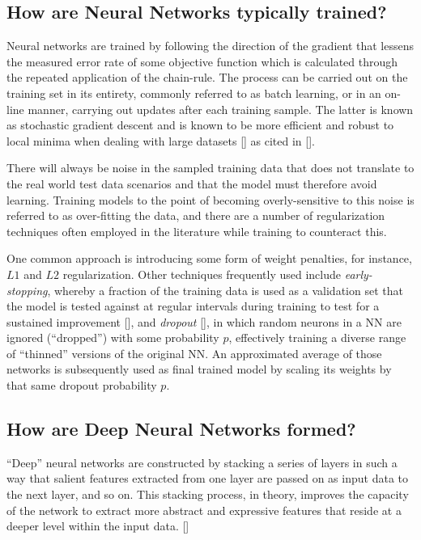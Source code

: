 \documentclass[12pt, a4paper]{report}
\theoremstyle{definition}
\theoremstyle{definition}%
\theoremstyle{definition}%
\theoremstyle{definition}%
\theoremstyle{definition}%
\theoremstyle{definition}%
\renewcommand{\cite}[1]{[\citealp{#1}]}
\begin{document}
\subsection{How are Neural Networks typically trained?}
Neural networks are trained by following the direction of the gradient that lessens the measured error rate of some objective function which is calculated through the repeated application of the chain-rule. The process can be carried out on the training set in its entirety, commonly referred to as batch learning, or in an on-line manner, carrying out updates after each training sample. The latter is known as stochastic gradient descent and is known to be more efficient and robust to local minima when dealing with large datasets \cite{lecun1998} as cited in \cite{graves2012b}.

There will always be noise in the sampled training data that does not translate to the real world test data scenarios and that the model must therefore avoid learning. Training models to the point of becoming overly-sensitive to this noise is referred to as over-fitting the data, and there are a number of regularization techniques often employed in the literature while training to counteract this.

One common approach is introducing some form of weight penalties, for instance, $L1$ and $L2$ regularization. Other techniques frequently used include \textit{early-stopping}, whereby a fraction of the training data is used as a validation set that the model is tested against at regular intervals during training to test for a sustained improvement \cite{graves2012}, and \textit{dropout} \cite{srivastava2014}, in which random neurons in a NN are ignored (\enquote{dropped}) with some probability $p$, effectively training a diverse range of \enquote{thinned} versions of the original NN. An approximated average of those networks is subsequently used as final trained model by scaling its weights by that same dropout probability $p$.

\subsection{How are Deep Neural Networks formed?}
\enquote{Deep} neural networks are constructed by stacking a series of layers in such a way that salient features extracted from one layer are passed on as input data to the next layer, and so on. This stacking process, in theory, improves the capacity of the network to extract more abstract and expressive features that reside at a deeper level within the input data. \cite{zhang2018}
\end{document}
